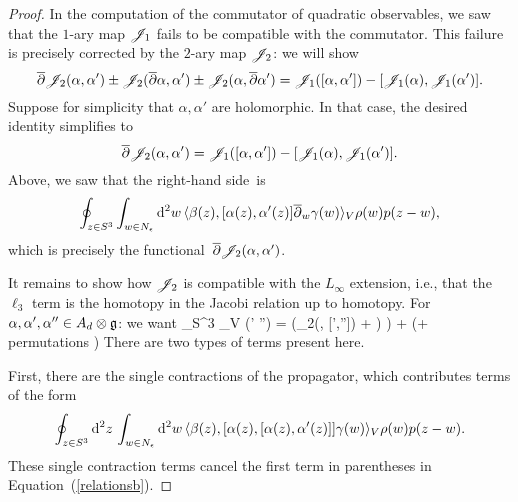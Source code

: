 \begin{proof}
In the computation of the commutator of quadratic observables,
we saw that the $1$-ary map $\mathscr J_1$ fails to be compatible with the commutator.
This failure is precisely corrected by the $2$-ary map $\mathscr J_2$: 
we will show
\[
\overline{\partial} \mathscr J_2(\alpha, \alpha') \pm \mathscr J_2(\overline{\partial} \alpha, \alpha') \pm \mathscr J_2(\alpha, \overline{\partial} \alpha') = \mathscr J_1([\alpha,\alpha']) - [\mathscr J_1(\alpha), \mathscr J_1(\alpha')] .
\] 
Suppose for simplicity that $\alpha,\alpha'$ are holomorphic.
In that case, the desired identity simplifies to 
\[
\overline{\partial} \mathscr J_2(\alpha, \alpha') = \mathscr J_1([\alpha,\alpha']) - [\mathscr J_1(\alpha), \mathscr J_1(\alpha')].
\]
Above, we saw that the right-hand side~is
\[
\oint_{z \in S^3} \int_{w \in N_{\epsilon}} {\rm d}^2 w\,  \langle\beta(z), [\alpha(z),\alpha'(z)] \overline{\partial}_w \gamma(w) \rangle_V \rho(w) p(z-w),
\]
which is precisely the functional~$\overline{\partial} \mathscr J_2(\alpha,\alpha')$. 

It remains to show how $\mathscr J_2$ is compatible with the $L_\infty$ extension,
i.e., that the $\ell_3$ term is the homotopy in the Jacobi relation up to homotopy.
For $\alpha,\alpha',\alpha'' \in A_d \otimes \mathfrak g$: we want
\beqn\label{relationsb}
\oint_{S^3} \Tr_V \left(\alpha\wedge \partial \alpha' \wedge \partial \alpha''\right) = \displaystyle \left(\sJ_2(\alpha, [\alpha',\alpha'']) + ) \right) + \left( + \; {\rm permutations} \right)
\eeqn
There are two types of terms present here. 

First, there are the single contractions of the propagator, which contributes terms of the form
\[
\oint_{z \in S^3} {\rm d}^2 z\, \int_{w \in N_{\epsilon}} {\rm d}^2 w\,  \langle\beta(z), [\alpha(z), [\alpha(z),\alpha'(z)] ] \gamma(w) \rangle_V \rho(w) p(z-w).
\]
These single contraction terms cancel the first term in parentheses in Equation~(\ref{relationsb}). 


\end{proof}
